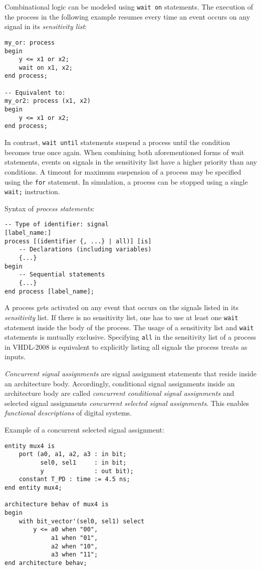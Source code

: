 \documentclass[fontsize=11pt,a4paper]{scrartcl}
\begin{document}
Combinational logic can be modeled using \lstinline!wait on! statements. The execution of the process in the following example resumes every time an event occurs on any signal in its \emph{sensitivity list}:
\begin{lstlisting}
my_or: process
begin
	y <= x1 or x2;
	wait on x1, x2;
end process;

-- Equivalent to:
my_or2: process (x1, x2)
begin
	y <= x1 or x2;
end process;
\end{lstlisting}

In contrast, \lstinline!wait until! statements suspend a process until the condition becomes true once again. When combining both aforementioned forms of wait statements, events on signals in the sensitivity list have a higher priority than any conditions. A timeout for maximum suspension of a process may be specified using the \lstinline!for! statement. In simulation, a process can be stopped using a single \lstinline!wait;! instruction.

Syntax of \emph{process statements}:
\begin{lstlisting}
-- Type of identifier: signal
[label_name:]
process [(identifier {, ...} | all)] [is]
	-- Declarations (including variables)
	{...}
begin
	-- Sequential statements
	{...}
end process [label_name];
\end{lstlisting}

A process gets activated on any event that occurs on the signals listed in its \emph{sensitivity} list. If there is no sensitivity list, one has to use at least one \lstinline!wait! statement inside the body of the process. The usage of a sensitivity list and \lstinline!wait! statements is mutually exclusive. Specifying \lstinline!all! in the sensitivity list of a process in VHDL-2008 is equivalent to explicitly listing all signals the process treats as inputs.

\emph{Concurrent signal assignments} are signal assignment statements that reside inside an architecture body. Accordingly, conditional signal assignments inside an architecture body are called \emph{concurrent conditional signal assignments} and selected signal assignments \emph{concurrent selected signal assignments}. This enables \emph{functional descriptions} of digital systems.

Example of a concurrent selected signal assignment:
\begin{lstlisting}
entity mux4 is
	port (a0, a1, a2, a3 : in bit;
	      sel0, sel1     : in bit;
	      y              : out bit);
	constant T_PD : time := 4.5 ns;
end entity mux4;

architecture behav of mux4 is
begin
	with bit_vector'(sel0, sel1) select
		y <= a0 when "00",
		     a1 when "01",
		     a2 when "10",
		     a3 when "11";
end architecture behav;
\end{lstlisting}
\end{document}
